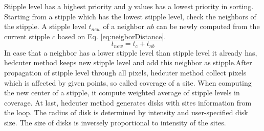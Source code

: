 \documentclass[11pt]{article}
\begin{document}
Stipple level has a highest priority and $y$ values has a lowest priority in sorting.
Starting from a stipple which has the lowest stipple level, check the neighbors of the stipple.
A stipple level $t_{new}$ of a neighbor $nb$ can be newly computed from the current stipple $c$ based on Eq. \ref{eq:neigborDistance}.
\begin{equation}\label{eq:neigborDistance}
t_{new}=t_{c} + t_{nb}
\end{equation}
In case that a neighbor has a lower stipple level than stipple level it already has, hedcuter method keeps new stipple level and add this neighbor as stipple.After propagation of stipple level through all pixels, hedcuter method collect pixels which is affected by given points, so called coverage of a site. When computing the new center of a stipple, it compute weighted average of stipple levels in coverage.
At last, hedcuter method generates disks with sites information from the loop. The radius of disk is determined by intensity and user-specified disk size. The size of disks is inversely proportional to intensity of the sites.

\end{document}

